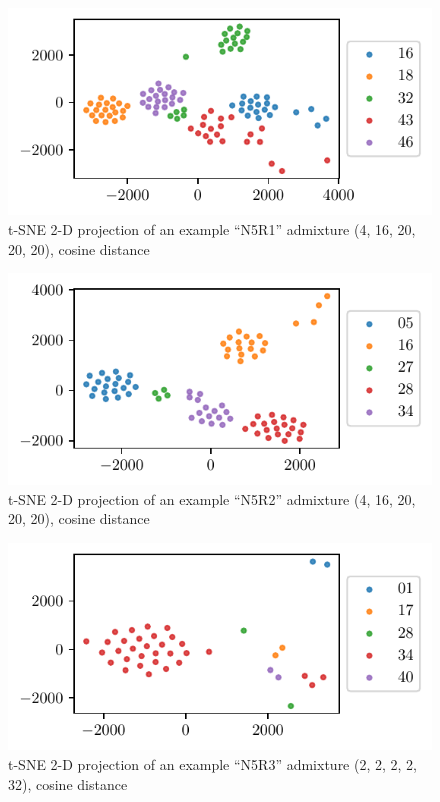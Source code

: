 \begin{figure}
\centering
\includegraphics{./figures/data_visualization/N5R1[0]-t-SNE (metric=cosine), X_heights.pdf}
\caption{t-SNE 2-D projection of an example ``N5R1'' admixture (4, 16, 20, 20, 20), cosine distance}
\label{fig:N5R1-t-SNE}
\end{figure}
\begin{figure}
\centering
\includegraphics{./figures/data_visualization/N5R2[0]-t-SNE (metric=cosine), X_heights.pdf}
\caption{t-SNE 2-D projection of an example ``N5R2'' admixture (4, 16, 20, 20, 20), cosine distance}
\label{fig:N5R2-t-SNE}
\end{figure}
\begin{figure}
\centering
\includegraphics{./figures/data_visualization/N5R3[0]-t-SNE (metric=cosine), X_heights.pdf}
\caption{t-SNE 2-D projection of an example ``N5R3'' admixture (2, 2, 2, 2, 32), cosine distance}
\label{fig:N5R3-t-SNE}
\end{figure}

